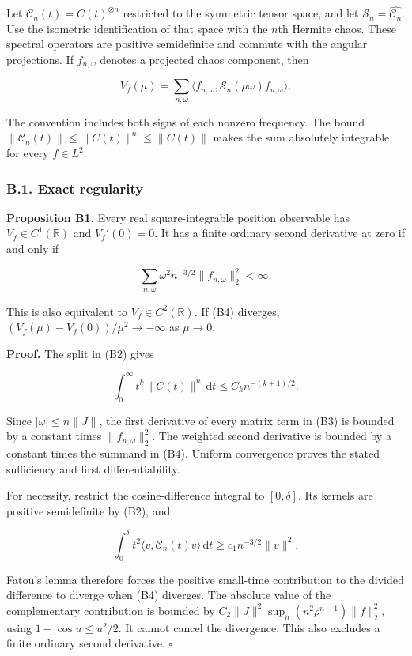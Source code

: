 \documentclass[
  british,
  11pt,
  a4paper,
]{article}
\begin{document}
Let \(\mathcal C_n(t)=C(t)^{\otimes n}\) restricted to the symmetric
tensor space, and let \(\mathcal S_n=\widehat{\mathcal C_n}\). Use the
isometric identification of that space with the \(n\)th Hermite chaos.
These spectral operators are positive semidefinite and commute with the
angular projections. If \(f_{n,\omega}\) denotes a projected chaos
component, then

\[
V_f(\mu)=\sum_{n,\omega}
\langle f_{n,\omega},\mathcal S_n(\mu\omega)f_{n,\omega}\rangle. \tag{B3}
\]

The convention includes both signs of each nonzero frequency. The bound
\(\|\mathcal C_n(t)\|\le\|C(t)\|^n\le\|C(t)\|\) makes the sum absolutely
integrable for every \(f\in L^2\).

\subsubsection{B.1. Exact regularity}\label{b.1.-exact-regularity}

\textbf{Proposition B1.} Every real square-integrable position
observable has \(V_f\in C^1(\mathbb R)\) and \(V_f'(0)=0\). It has a
finite ordinary second derivative at zero if and only if

\[
\sum_{n,\omega}\omega^2n^{-3/2}\|f_{n,\omega}\|_2^2<\infty. \tag{B4}
\]

This is also equivalent to \(V_f\in C^2(\mathbb R)\). If (B4) diverges,
\((V_f(\mu)-V_f(0))/\mu^2\to-\infty\) as \(\mu\to0\).

\textbf{Proof.} The split in (B2) gives

\[
\int_0^\infty t^k\|C(t)\|^n\,\mathrm dt\le C_k n^{-(k+1)/2}.
\]

Since \(|\omega|\le n\|J\|\), the first derivative of every matrix term
in (B3) is bounded by a constant times \(\|f_{n,\omega}\|_2^2\). The
weighted second derivative is bounded by a constant times the summand in
(B4). Uniform convergence proves the stated sufficiency and first
differentiability.

For necessity, restrict the cosine-difference integral to
\([0,\delta]\). Its kernels are positive semidefinite by (B2), and

\[
\int_0^\delta t^2\langle v,\mathcal C_n(t)v\rangle\,\mathrm dt
\ge c_1 n^{-3/2}\|v\|^2.
\]

Fatou's lemma therefore forces the positive small-time contribution to
the divided difference to diverge when (B4) diverges. The absolute value
of the complementary contribution is bounded by
\(C_2\|J\|^2\sup_n(n^2\rho^{n-1})\|f\|_2^2\), using
\(1-\cos u\le u^2/2\). It cannot cancel the divergence. This also
excludes a finite ordinary second derivative. \(\square\)
\end{document}
